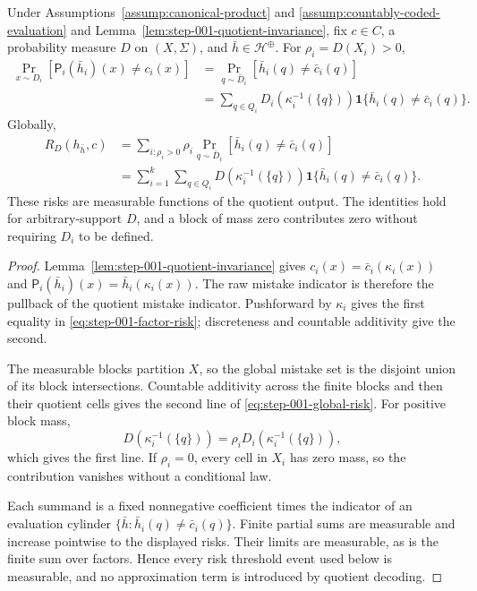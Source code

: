 \begin{lemma}
\label{lem:step-001-risk-pullback}
Under Assumptions~\ref{assump:canonical-product} and
\ref{assump:countably-coded-evaluation} and
Lemma~\ref{lem:step-001-quotient-invariance}, fix \(c\in C\), a probability
measure \(D\) on \((X,\Sigma)\), and \(\bar h\in\mathcal H^{\oplus}\).
For \(\rho_i=D(X_i)>0\),
\begin{equation}\label{eq:step-001-factor-risk}
\begin{split}
\Pr_{x\sim D_i}[\mathsf P_i(\bar h_i)(x)\ne c_i(x)]
&=\Pr_{q\sim\bar D_i}[\bar h_i(q)\ne\bar c_i(q)]\\
&=\sum_{q\in Q_i}D_i(\kappa_i^{-1}(\{q\}))
\mathbf1\{\bar h_i(q)\ne\bar c_i(q)\}.
\end{split}
\end{equation}
Globally,
\begin{equation}\label{eq:step-001-global-risk}
\begin{split}
R_D(h_{\bar h},c)
&=\sum_{i:\rho_i>0}\rho_i
\Pr_{q\sim\bar D_i}[\bar h_i(q)\ne\bar c_i(q)]\\
&=\sum_{i=1}^k\sum_{q\in Q_i}
D(\kappa_i^{-1}(\{q\}))
\mathbf1\{\bar h_i(q)\ne\bar c_i(q)\}.
\end{split}
\end{equation}
These risks are measurable functions of the quotient output.  The identities
hold for arbitrary-support \(D\), and a block of mass zero contributes zero
without requiring \(D_i\) to be defined.
\end{lemma}

\begin{proof}
Lemma~\ref{lem:step-001-quotient-invariance} gives
\(c_i(x)=\bar c_i(\kappa_i(x))\) and
\(\mathsf P_i(\bar h_i)(x)=\bar h_i(\kappa_i(x))\).  The raw mistake
indicator is therefore the pullback of the quotient mistake indicator.
Pushforward by \(\kappa_i\) gives the first equality in
\eqref{eq:step-001-factor-risk}; discreteness and countable additivity give
the second.

The measurable blocks partition \(X\), so the global mistake set is the
disjoint union of its block intersections.  Countable additivity across the
finite blocks and then their quotient cells gives the second line of
\eqref{eq:step-001-global-risk}.  For positive block mass,
\[
D(\kappa_i^{-1}(\{q\}))
=\rho_iD_i(\kappa_i^{-1}(\{q\})),
\]
which gives the first line.  If \(\rho_i=0\), every cell in \(X_i\) has
zero mass, so the contribution vanishes without a conditional law.

Each summand is a fixed nonnegative coefficient times the indicator of an
evaluation cylinder \(\{\bar h:\bar h_i(q)\ne\bar c_i(q)\}\).  Finite
partial sums are measurable and increase pointwise to the displayed risks.
Their limits are measurable, as is the finite sum over factors.  Hence every
risk threshold event used below is measurable, and no approximation term is
introduced by quotient decoding.
\end{proof}


